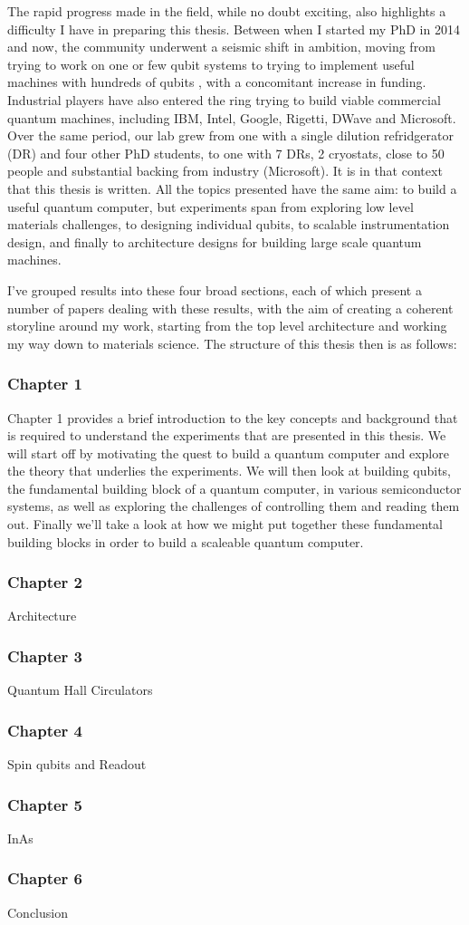 The rapid progress made in the field, while no doubt exciting, also highlights a difficulty I have in
preparing this thesis. Between when I started my PhD in 2014 and now, the community underwent a seismic
shift in ambition, moving from trying to work on one or few qubit systems \cite{iarpa_mqco} to trying 
to implement useful machines with hundreds of qubits \cite{Monroe440}, with a concomitant increase in
funding. Industrial players have also
entered the ring trying to build viable commercial quantum machines, including IBM, Intel, Google, Rigetti, 
DWave and Microsoft. Over the same period, our lab grew from one with a single dilution refridgerator (DR) 
and four other PhD students, to one with 7 DRs, 2 cryostats, close to 50 people and substantial backing
from industry (Microsoft). It is in that context that this thesis is written. All the topics presented have the
same aim: to build a useful quantum computer, but experiments span from exploring low level materials challenges,
to designing individual qubits, to scalable instrumentation design, and finally to architecture
designs for building large scale quantum machines. 

I've grouped results into these four broad sections, each of which present a number of papers dealing 
with these results, with the aim of creating a coherent storyline around my work, starting from the top
level architecture and working my way down to materials science. The structure of this
thesis then is as follows:

\subsubsection{Chapter 1}
Chapter 1 provides a brief introduction to the key concepts and background that is required to understand
the experiments that are presented in this thesis. We will start off by motivating the quest to build a quantum
computer and explore the theory that underlies the experiments. We will then look at building qubits,
the fundamental building block of a quantum computer, in various semiconductor systems, as well as exploring
the challenges of controlling them and reading them out. Finally we'll take a look at how we might put
together these fundamental building blocks in order to build a scaleable quantum computer.

\subsubsection{Chapter 2}
Architecture

\subsubsection{Chapter 3}
Quantum Hall Circulators

\subsubsection{Chapter 4}
Spin qubits and Readout

\subsubsection{Chapter 5}
InAs

\subsubsection{Chapter 6}
Conclusion

